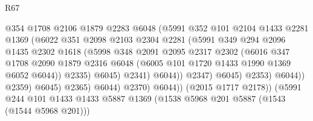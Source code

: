 \begin{lexlean}{R67}
\begin{coremodule}
                                    @354
                                    @1708
                                    @2106
                                    @1879
                                    @2283
                                    @6048
                                    (@5991
                                      @352
                                      @101
                                      @2104
                                      @1433
                                      @2281
                                      @1369
                                      (@6022
                                        @351
                                        @2098
                                        @2103
                                        @2304
                                        @2281
                                        (@5991
                                          @349
                                          @294
                                          @2096
                                          @1435
                                          @2302
                                          @1618
                                          (@5998
                                            @348
                                            @2091
                                            @2095
                                            @2317
                                            @2302
                                            (@6016
                                              @347
                                              @1708
                                              @2090
                                              @1879
                                              @2316
                                              @6048
                                              (@6005 @101 @1720 @1433 @1990 @1369 @6052 @6044))
                                            @2335)
                                          @6045)
                                        @2341)
                                      @6044))
                                  @2347)
                                @6045)
                              @2353)
                            @6044))
                        @2359)
                      @6045)
                    @2365)
                  @6044)
                @2370)
              @6044))
          (@2015 @1717 @2178))
        (@5991
          @244
          @101
          @1433
          @1433
          @5887
          @1369
          (@1538 @5968 @201 @5887 (@1543 (@1544 @5968 @201)))

\end{coremodule}
\end{lexlean}
